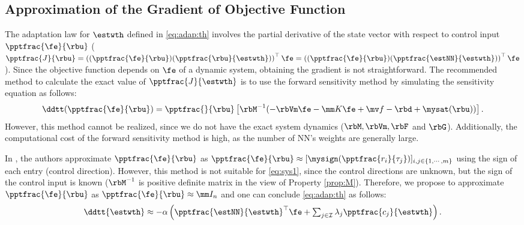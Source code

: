 \documentclass[lettersize,journal]{IEEEtran}
\begin{document}
\subsection{Approximation of the Gradient of Objective Function}

The adaptation law for $\estwth$ defined in \eqref{eq:adap:th} involves the partial derivative of the state vector with respect to control input $\pptfrac{\fe}{\rbu}$ (\ie 
$
    \pptfrac{J}{\rbu}
    =
    \left(
        (\pptfrac{\fe}{\rbu})
        (\pptfrac{\rbu}{\estwth})
    \right)
    ^\top \fe
    =
    \left(
        (\pptfrac{\fe}{\rbu})
        (\pptfrac{\estNN}{\estwth})
    \right)
    ^\top \fe
$). 
Since the objective function depends on $\fe$ of a dynamic system, obtaining the gradient is not straightforward. 
The recommended method to calculate the exact value of $\pptfrac{J}{\estwth}$ is to use the forward sensitivity method \cite{Sengupta:2014aa} by simulating the sensitivity equation as follows: 
\begin{equation}
    \ddtt (
        \pptfrac{\fe}{\rbu}
    )
    =
    \pptfrac{}{
        \rbu
    }
    \left[
        \rbM^{-1}(
            -\rbVm \fe
            -\mm K \fe
            + \mv f
            -\rbd + \mysat(\rbu)
        )
    \right]
    .
\end{equation}
However, this method cannot be realized, since we do not have the exact system dynamics (\ie $\rbM,\rbVm, \rbF$ and $ \rbG$).
Additionally, the computational cost of the forward sensitivity method is high, as the number of NN's weights are generally large.

In \cite{Douratsos:2007aa,Saerens:1991aa}, the authors approximate $\pptfrac{\fe}{\rbu}$ as $
    \pptfrac{\fe}{\rbu}
    \approx
    [
        \mysign(\pptfrac{r_i}{\tau_j})
    ]_{i,j\in\{1,\cdots,m\}}
$ using the sign of each entry (\ie control direction).
However, this method is not suitable for \eqref{eq:sys1}, since the control directions are unknown, but the sign of the control input is known (\ie $\rbM^{-1}$ is positive definite matrix in the view of Property \ref{prop:M}).
Therefore, we propose to approximate $\pptfrac{\fe}{\rbu}$ as $\pptfrac{\fe}{\rbu}\approx \mm I_n$ and one can conclude \eqref{eq:adap:th} as follows:
\begin{equation}
    \ddtt{\estwth}
    \approx
    -\alpha 
    \left(
        \pptfrac{\estNN}
        {\estwth}^\top
        \fe
        +
        \textstyle\sum_{j\in\mathcal{I}}
        \lambda_j 
        \pptfrac{c_j}{\estwth}
    \right)
    .
    \label{eq:adap:th:approx}
\end{equation}
\end{document}
